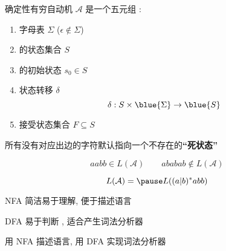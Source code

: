 \begin{frame}{}
  \begin{definition}
    确定性有穷自动机 $\mathcal{A}$ 是一个五元组
    :

    \vspace{0.30cm}
    \begin{enumerate}[(1)]
      \item 字母表 $\Sigma$ ($\epsilon \notin \Sigma$)
      \item {}的状态集合 $S$
      \item {}的初始状态 $s_{0} \in S$
      \item 状态转移 $\delta$
        \[
          \delta: S \times \blue{\Sigma} \to \blue{S}
        \]
      \item 接受状态集合 $F \subseteq S$
    \end{enumerate}
  \end{definition}


  \pause
  \begin{center}
     所有没有对应出边的字符默认指向一个不存在的{\bf ``死状态''}
  \end{center}
\end{frame}

\begin{frame}{}

  \[
    aabb \in L(\mathcal{A}) \qquad ababab \notin L(\mathcal{A})
  \]

  \pause
  \[
    L(\mathcal{A}) = \pause L((a|b)^{\ast}abb)
  \]

  \pause
\end{frame}

\begin{frame}{}
  \begin{center}
    NFA 简洁易于理解, 便于描述语言 

    \vspace{0.30cm}
    DFA 易于判断 , 适合产生词法分析器

    \pause
    \vspace{1.20cm}
    用 NFA 描述语言, 用 DFA 实现词法分析器

    \vspace{0.30cm}
  \end{center}
\end{frame}
